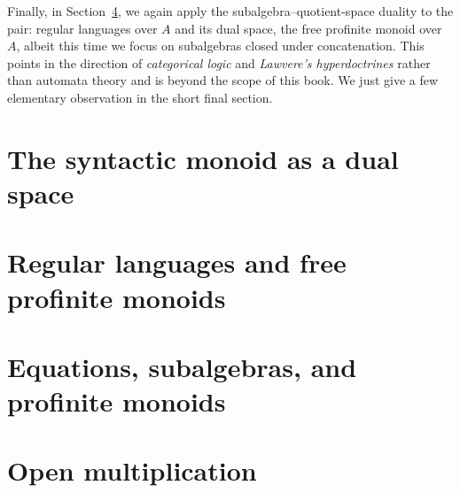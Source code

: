Finally, in Section~\ref{sec:openmult}, we again apply the subalgebra--quotient-space duality to the pair: regular languages over $A$ and its dual space, the free profinite monoid over $A$, albeit this time we focus on subalgebras closed under concatenation. This points in the direction of \emph{categorical logic} and \emph{Lawvere's hyperdoctrines} rather than automata theory and is beyond the scope of this book. We just give a few elementary observation in the short final section.

\section{The syntactic monoid as a dual space}\label{sec:syntmon}


\section{Regular languages and free profinite monoids}\label{sec:freeprofmonoid}





\section{Equations, subalgebras, and profinite monoids}\label{sec:EilReittheory}





\section{Open multiplication}\label{sec:openmult}


